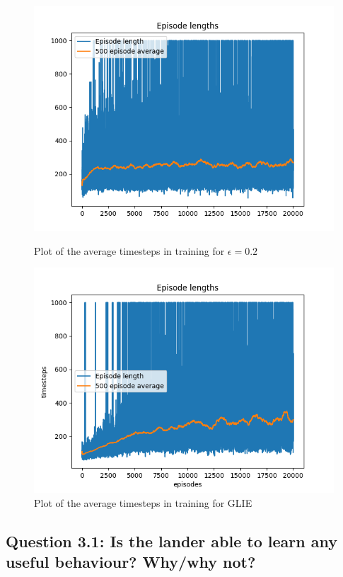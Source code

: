 \documentclass[12pt]{article}
\begin{document}
\begin{figure}[ht]
    \centering
   \begin{minipage}{0.48\textwidth}
     \centering
     \includegraphics[width=0.9\linewidth]{exercise-3/plots/lunarlander-episodes-fixed-0.2.png}
     \caption{Plot of the average timesteps in training for $\epsilon=0.2$}
     \label{fig:task-2-1}
   \end{minipage}\hfill
   \begin{minipage}{0.48\textwidth}
     \centering
     \includegraphics[width=0.9\linewidth]{exercise-3/plots/lunarlander-episodes-variable-0.0.png}
     \caption{Plot of the average timesteps in training for GLIE}
     \label{fig:task-2-2}
   \end{minipage}
\end{figure}

\subsection{Question 3.1: Is the lander able to learn any useful behaviour? Why/why not?}
\end{document}

